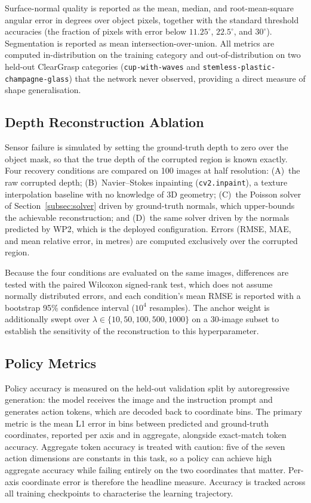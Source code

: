 Surface-normal quality is reported as the mean, median, and root-mean-square angular error in degrees over object pixels, together with the standard threshold accuracies (the fraction of pixels with error below $11.25^{\circ}$, $22.5^{\circ}$, and $30^{\circ}$). Segmentation is reported as mean intersection-over-union. All metrics are computed in-distribution on the training category and out-of-distribution on two held-out ClearGrasp categories (\texttt{cup-with-waves} and \texttt{stemless-plastic-champagne-glass}) that the network never observed, providing a direct measure of shape generalisation.

\subsection{Depth Reconstruction Ablation}
\label{subsec:ablation_design}

Sensor failure is simulated by setting the ground-truth depth to zero over the object mask, so that the true depth of the corrupted region is known exactly. Four recovery conditions are compared on 100 images at half resolution: (A)~the raw corrupted depth; (B)~Navier--Stokes inpainting (\texttt{cv2.inpaint}), a texture interpolation baseline with no knowledge of 3D geometry; (C)~the Poisson solver of Section~\ref{subsec:solver} driven by ground-truth normals, which upper-bounds the achievable reconstruction; and (D)~the same solver driven by the normals predicted by WP2, which is the deployed configuration. Errors (RMSE, MAE, and mean relative error, in metres) are computed exclusively over the corrupted region.

Because the four conditions are evaluated on the same images, differences are tested with the paired Wilcoxon signed-rank test, which does not assume normally distributed errors, and each condition's mean RMSE is reported with a bootstrap 95\% confidence interval ($10^{4}$ resamples). The anchor weight is additionally swept over $\lambda \in \{10, 50, 100, 500, 1000\}$ on a 30-image subset to establish the sensitivity of the reconstruction to this hyperparameter.

\subsection{Policy Metrics}
\label{subsec:policy_metrics}

Policy accuracy is measured on the held-out validation split by autoregressive generation: the model receives the image and the instruction prompt and generates action tokens, which are decoded back to coordinate bins. The primary metric is the mean L1 error in bins between predicted and ground-truth coordinates, reported per axis and in aggregate, alongside exact-match token accuracy. Aggregate token accuracy is treated with caution: five of the seven action dimensions are constants in this task, so a policy can achieve high aggregate accuracy while failing entirely on the two coordinates that matter. Per-axis coordinate error is therefore the headline measure. Accuracy is tracked across all training checkpoints to characterise the learning trajectory.

